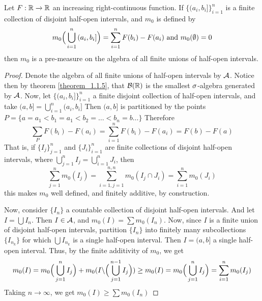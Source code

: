\begin{lemma}\label{lemma_1.4.2}
    Let $F:\mathbb{R} \xrightarrow{} \mathbb{R}$ an increasing right-continuous function. If
    $\{(a_i,b_i]\}_{i=1}^n$ is a finite collection of disjoint half-open
    intervals, and $m_0$ is defined by
    \begin{equation}\label{equation_1.8}
        m_0\Big{(} \bigcup_{i=1}^n{(a_i,b_i]}
        \Big{)}=\sum_{i=1}^n{F(b_i)-F(a_i)} \text{ and } m_0(\emptyset)=0
    \end{equation}
    then $m_0$ is a pre-measure on the algebra of all finite unions of half-open
    intervals.
\end{lemma}
\begin{proof}
    Denote the algebra of all finite unions of half-open intervals by $\mathcal{A}$.
    Notice then by theorem \ref{theorem_1.1.5}, that $\mathcal{B}(\mathbb{R})$ is the
    smallest $\sigma$-algebra generated by $\mathcal{A}$. Now, let $\{(a_i,b_i]\}_{i=1}^n$ a
    finite disjoint collection of half-open intervals, and take
    $(a,b]=\bigcup_{i=1}^n{(a_i,b_i]}$ Then $(a,b]$ is partitioned by the points
    $P=\{a=a_1<b_1=a_1<b_2= \dots <b_n=b \dots \}$ Therefore
    \begin{equation*}
        \sum_{P}{F(b_i)-F(a_i)}=\sum_{i=1}^n{F(b_i)-F(a_i)}=F(b)-F(a)
    \end{equation*}
    That is, if $\{I_j\}_{j=1}^n$ and $\{J_i\}_{i=1}^n$ are finite collections
    of disjoint half-open intervals, where
    $\bigcup_{j=1}^n{I_j}=\bigcup_{i=1}^n{J_i}$, then
    \begin{equation*}
        \sum_{j=1}^n{m_0(I_j)}=\sum_{i=1,j=1}^{n,n}{m_0(I_j \cap J_i)}=
        \sum_{i=1}^n{m_0(J_i)}
    \end{equation*}
    this makes $m_0$ well defined, and finitely additive, by construction.

    Now, consider $\{I_n\}$ a countable collection of disjoint half-open
    intervals. And let $I=\bigcup{I_n}$. Then $I \in \mathcal{A}$, and
    $m_0(I)=\sum{m_0(I_n)}$. Now, since $I$ is a finite union of disjoint
    half-open intervals, partition  $\{I_n\}$ into finitely many subcollections
    $\{I_{n_k}\}$ for which $\bigcup{I_{n_k}}$ is a single half-open interval.
    Then $I=(a,b]$ a single half-open interval. Thus, by the finite additivity
    of $m_0$, we get
    \begin{equation*}
        m_0(I)=m_0\Big{(} \bigcup_{j=1}^n{I_j} \Big{)}+
        m_0(I \backslash \Big{(} \bigcup_{j=1}^{n-1}{I_j} \Big{)}) \geq
        m_0(I)=m_0\Big{(} \bigcup_{j=1}^n{I_j} \Big{)}=\sum_{i=1}^n{m_0(I_j)}
    \end{equation*}
    Taking $n \xrightarrow{} \infty$, we get $m_0(I) \geq \sum{m_0(I_n)}$


\end{proof}
